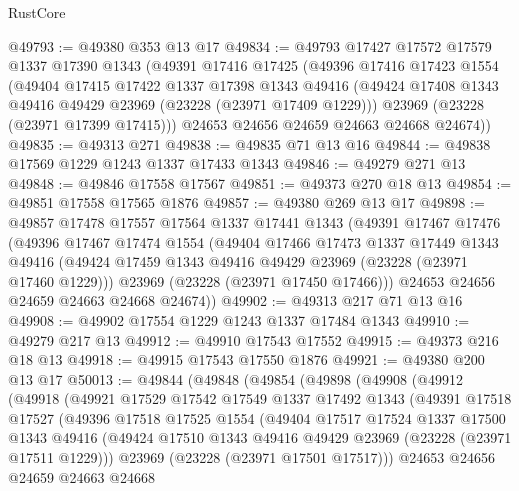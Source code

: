 \begin{lexlean}{RustCore}
\begin{coremodule}
@49793 := @49380 @353 @13 @17
@49834 := @49793
    @17427
    @17572
    @17579
    @1337
    @17390
    @1343
    (@49391
      @17416
      @17425
      (@49396
        @17416
        @17423
        @1554
        (@49404
          @17415
          @17422
          @1337
          @17398
          @1343
          @49416
          (@49424 @17408 @1343 @49416 @49429 @23969 (@23228 (@23971 @17409 @1229)))
          @23969
          (@23228 (@23971 @17399 @17415)))
        @24653
        @24656
        @24659
        @24663
        @24668
        @24674))
@49835 := @49313 @271
@49838 := @49835 @71 @13 @16
@49844 := @49838 @17569 @1229 @1243 @1337 @17433 @1343
@49846 := @49279 @271 @13
@49848 := @49846 @17558 @17567
@49851 := @49373 @270 @18 @13
@49854 := @49851 @17558 @17565 @1876
@49857 := @49380 @269 @13 @17
@49898 := @49857
    @17478
    @17557
    @17564
    @1337
    @17441
    @1343
    (@49391
      @17467
      @17476
      (@49396
        @17467
        @17474
        @1554
        (@49404
          @17466
          @17473
          @1337
          @17449
          @1343
          @49416
          (@49424 @17459 @1343 @49416 @49429 @23969 (@23228 (@23971 @17460 @1229)))
          @23969
          (@23228 (@23971 @17450 @17466)))
        @24653
        @24656
        @24659
        @24663
        @24668
        @24674))
@49902 := @49313 @217 @71 @13 @16
@49908 := @49902 @17554 @1229 @1243 @1337 @17484 @1343
@49910 := @49279 @217 @13
@49912 := @49910 @17543 @17552
@49915 := @49373 @216 @18 @13
@49918 := @49915 @17543 @17550 @1876
@49921 := @49380 @200 @13 @17
@50013 := @49844
    (@49848
      (@49854
        (@49898
          (@49908
            (@49912
              (@49918
                (@49921
                  @17529
                  @17542
                  @17549
                  @1337
                  @17492
                  @1343
                  (@49391
                    @17518
                    @17527
                    (@49396
                      @17518
                      @17525
                      @1554
                      (@49404
                        @17517
                        @17524
                        @1337
                        @17500
                        @1343
                        @49416
                        (@49424 @17510 @1343 @49416 @49429 @23969 (@23228 (@23971 @17511 @1229)))
                        @23969
                        (@23228 (@23971 @17501 @17517)))
                      @24653
                      @24656
                      @24659
                      @24663
                      @24668

\end{coremodule}
\end{lexlean}
